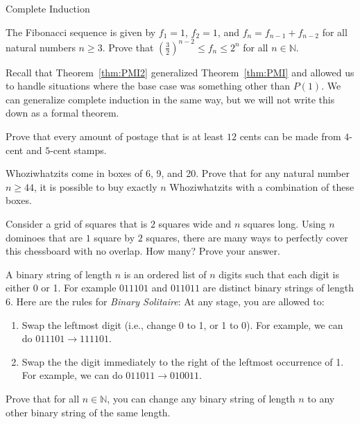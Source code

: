 \begin{section}{Complete Induction}

\begin{problem}\label{prob:Fibonacci}
The Fibonacci sequence is given by $f_1=1$, $f_2=1$, and $f_n=f_{n-1}+f_{n-2}$ for all natural numbers $n \geq 3$.  Prove that $\left(\frac{3}{2}\right)^{n-2}\leq f_n\leq 2^n$ for all $n\in\mathbb{N}$.
\end{problem}

Recall that Theorem~\ref{thm:PMI2} generalized Theorem~\ref{thm:PMI} and allowed us to handle situations where the base case was something other than $P(1)$.  We can generalize complete induction in the same way, but we will not write this down as a formal theorem.

\begin{problem}
Prove that every amount of postage that is at least $12$ cents can be made from $4$-cent and $5$-cent stamps.
\end{problem}


\begin{problem}
Whoziwhatzits come in boxes of 6, 9, and 20. Prove that for any natural number $n \geq 44$, it is possible to buy exactly $n$ Whoziwhatzits with a combination of these boxes.
\end{problem}

\begin{problem}
Consider a grid of squares that is $2$ squares wide and $n$ squares long.  Using $n$ dominoes that are $1$ square by $2$ squares, there are many ways to perfectly cover this chessboard with no overlap.  How many?  Prove your answer.
\end{problem}

\begin{problem}
A binary string of length $n$ is an ordered list of $n$ digits such that each digit is either 0 or 1. For example $011101$ and $011011$ are distinct binary strings of length 6. Here are the rules for \emph{Binary Solitaire}: At any stage, you are allowed to:
\begin{enumerate}[label=\textrm{(\roman*)}]
\item Swap the leftmost digit (i.e., change 0 to 1, or 1 to 0). For example, we can do $011101\to 111101$.
\item Swap the the digit immediately to the right of the leftmost occurrence of 1. For example, we can do $011011\to 010011$.
\end{enumerate}
Prove that for all $n\in\mathbb{N}$, you can change any binary string of length $n$ to any other binary string of the same length.
\end{problem}


\end{section}
